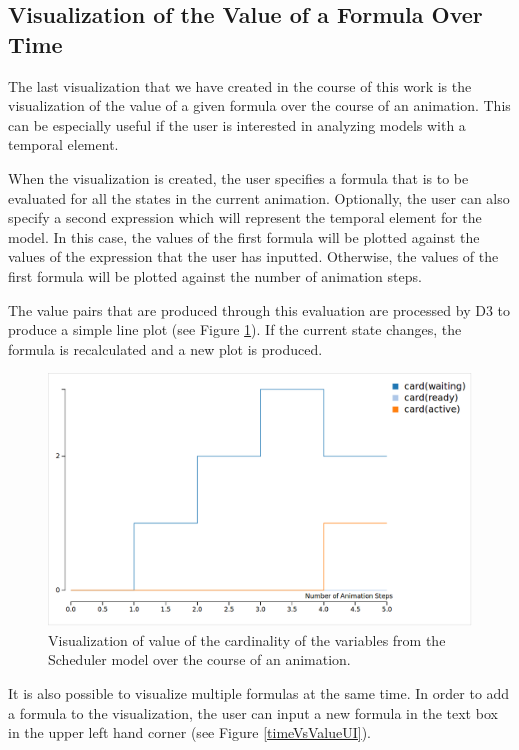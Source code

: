 \subsection{Visualization of the Value of a Formula Over Time}

The last visualization that we have created in the course of this work is the visualization of the value of a given formula over the course of an animation.
This can be especially useful if the user is interested in analyzing models with a temporal element. 

When the visualization is created, the user specifies a formula that is to be evaluated for all the states in the current animation. Optionally, the user can also specify a second expression which will represent the temporal element for the model. In this case, the values of the first formula will be plotted against the values of the expression that the user has inputted. Otherwise, the values of the first formula will be plotted against the number of animation steps.

The value pairs that are produced through this evaluation are processed by D3 to produce a simple line plot (see Figure \ref{timeVsValue}). If the current state changes, the formula is recalculated and a new plot is produced.

\begin{center}
\begin{figure}[h!]
\centering
\includegraphics[width=14cm]{bilder/valueOverTime.png}
\caption{Visualization of value of the cardinality of the variables from the Scheduler model over the course of an animation.}
\label{timeVsValue}
\end{figure}
\end{center}

It is also possible to visualize multiple formulas at the same time. In order to add a formula to the visualization, the user can input a new formula in the text box in the upper left hand corner (see Figure \ref{timeVsValueUI}).

